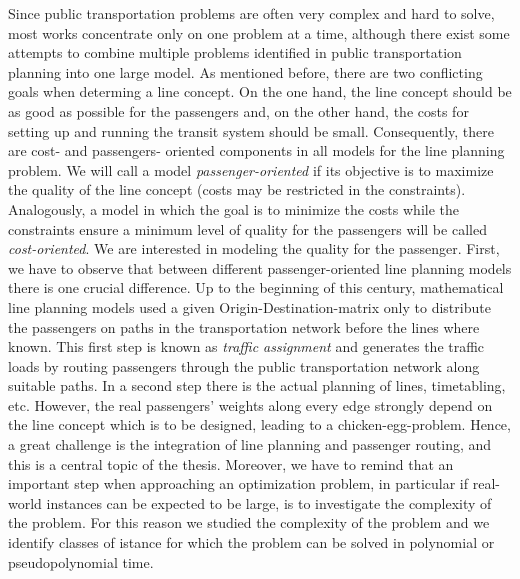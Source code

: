 \documentclass[
  twoside,
  11pt, a4paper,
  footinclude=true,
  headinclude=true,
  cleardoublepage=empty
]{scrbook}
\theoremstyle{definition}
\begin{document}
Since public transportation problems are often very complex and hard to solve, most works concentrate only on one problem at a time, although there exist some attempts to combine multiple problems identified in public transportation planning into one large model. \newline
As mentioned before, there are two conflicting goals when determing a line concept. On the one hand, the line concept should be as good as possible for the passengers and, on the other hand, the costs for setting up and running the transit system should be small. Consequently, there are cost- and passengers- oriented components in all models for the line planning problem. We will call a model \emph{passenger-oriented} if its objective is to maximize the quality of the line concept (costs may be restricted in the constraints). Analogously, a model in which the goal is to minimize the costs while the constraints ensure a minimum level of quality for the passengers will be called \emph{cost-oriented}. \newline
We are interested in modeling the quality for the passenger. \newline
First, we have to observe that between different passenger-oriented line planning models there is one crucial difference. \newline
Up to the beginning of this century, mathematical line planning models used a given Origin-Destination-matrix only to distribute the passengers on paths in the transportation network before the lines where known. This first step is known as \emph{traffic assignment} and generates the traffic loads by routing passengers through the public transportation network along suitable paths. In  a second step there is the actual planning of lines, timetabling, etc. \newline
However, the real passengers' weights along every edge strongly depend on the line concept which is to be designed, leading to a chicken-egg-problem. \newline
Hence, a great challenge is the integration of line planning and passenger routing, and this is a central topic of the thesis. \newline
Moreover, we have to remind that an important step when approaching an optimization problem, in particular if real-world instances can be expected to be large, is to investigate the complexity of the problem. For this reason we studied the complexity of the problem and we identify classes of istance  for which the problem can be solved in polynomial or pseudopolynomial time.
\end{document}
